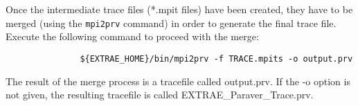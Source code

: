 Once the intermediate trace files (*.mpit files) have been created, they have to be merged (using the {\tt mpi2prv} command) in order to generate the final \PARAVER trace file. Execute the following command to proceed with the merge:

\begin{verbatim}
               ${EXTRAE_HOME}/bin/mpi2prv -f TRACE.mpits -o output.prv
\end{verbatim}

The result of the merge process is a \PARAVER tracefile called output.prv. If the -o option is not given, the resulting tracefile is called EXTRAE\_Paraver\_Trace.prv. 

